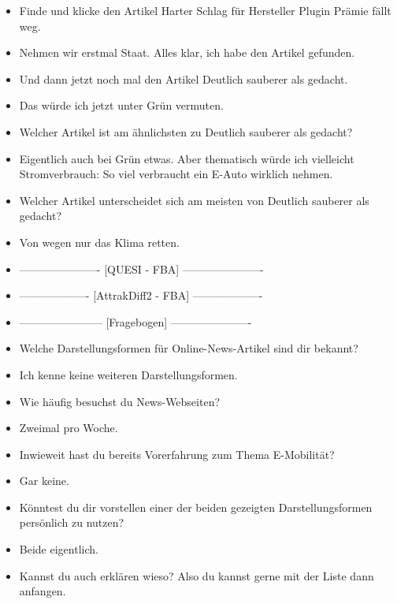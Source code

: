 {\begin{itemize}[]
            \item {} Finde und klicke den Artikel \flqq Harter Schlag für Hersteller Plugin Prämie fällt weg\frqq{}.
            \item {} Nehmen wir erstmal Staat. Alles klar, ich habe den Artikel gefunden.
            \item {} Und dann jetzt noch mal den Artikel \flqq Deutlich sauberer als gedacht\frqq{}.
            \item {} Das würde ich jetzt unter Grün vermuten.
            \item {} Welcher Artikel ist am ähnlichsten zu \flqq Deutlich sauberer als gedacht\frqq{}?
            \item {} Eigentlich auch bei Grün etwas.
                  Aber thematisch würde ich vielleicht \flqq Stromverbrauch: So viel verbraucht ein E-Auto wirklich\frqq{} nehmen.
            \item {} Welcher Artikel unterscheidet sich am meisten von \flqq Deutlich sauberer als gedacht\frqq{}?
            \item {} \flqq Von wegen nur das Klima retten\frqq{}.
            \item {----------------------} [QUESI - FBA] {----------------------}
            \item {-------------------} [AttrakDiff2 - FBA] {-------------------}
            \item {-----------------------} [Fragebogen] {----------------------}
            \item {} Welche Darstellungsformen für Online-News-Artikel sind dir bekannt?
            \item {} Ich kenne keine weiteren Darstellungsformen.
            \item {} Wie häufig besuchst du News-Webseiten?
            \item {} Zweimal pro Woche.
            \item {} Inwieweit hast du bereits Vorerfahrung zum Thema E-Mobilität?
            \item {} Gar keine.
            \item {} Könntest du dir vorstellen einer der beiden gezeigten Darstellungsformen persönlich zu nutzen?
            \item {} Beide eigentlich.
            \item {} Kannst du auch erklären wieso? Also du kannst gerne mit der Liste dann anfangen.

\end{itemize}}
